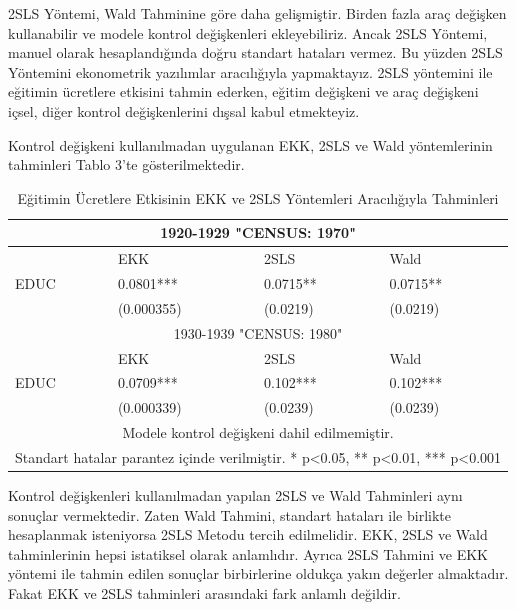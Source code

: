 \documentclass[12pt, a4paper, showtrims]{article}
\begin{document}
\begin{justify}
\begin{justify}
\begin{justify}
    2SLS Yöntemi, Wald Tahminine göre daha gelişmiştir. Birden fazla araç değişken kullanabilir ve 
    modele kontrol değişkenleri ekleyebiliriz. Ancak 2SLS Yöntemi, manuel olarak hesaplandığında doğru standart
    hataları vermez. Bu yüzden 2SLS Yöntemini ekonometrik yazılımlar aracılığıyla yapmaktayız.
    2SLS yöntemini ile eğitimin ücretlere etkisini tahmin ederken, eğitim değişkeni ve araç değişkeni içsel,
    diğer kontrol değişkenlerini dışsal kabul etmekteyiz.
    
    Kontrol değişkeni kullanılmadan uygulanan EKK, 2SLS ve Wald yöntemlerinin tahminleri Tablo 3'te 
    gösterilmektedir.



    \begin{table}[h]
        \centering
        \caption{Eğitimin Ücretlere Etkisinin EKK ve 2SLS Yöntemleri Aracılığıyla Tahminleri}
        \begin{tabular}{|p{4cm}||p{2cm}|p{2cm}|p{2cm}|}   
        \hline
        \multicolumn{4}{|c|}{1920-1929 "CENSUS: 1970"} \\
         \hline
          & EKK & 2SLS & Wald \\ [0.5ex] 
         \hline
          EDUC &  0.0801***  &  0.0715**  & 0.0715** \\ & (0.000355) & (0.0219) & (0.0219)  \\ 
        \hline
        \multicolumn{4}{|c|}{1930-1939 "CENSUS: 1980"} \\
         \hline
          & EKK & 2SLS & Wald \\ [0.5ex] 
         \hline
          EDUC & 0.0709*** & 0.102***  & 0.102*** \\ & (0.000339) & (0.0239) & (0.0239)  \\ 
        \hline
        \multicolumn{4}{|c|}{Modele kontrol değişkeni dahil edilmemiştir.} \\
        \hline
        \multicolumn{4}{|c|}{Standart hatalar parantez içinde verilmiştir. * p<0.05, ** p<0.01, *** p<0.001} \\
        \hline
        
        
        \end{tabular}
    \end{table}
    
    Kontrol değişkenleri kullanılmadan yapılan 2SLS ve Wald Tahminleri aynı sonuçlar vermektedir.
    Zaten Wald Tahmini, standart hataları ile birlikte hesaplanmak isteniyorsa 2SLS Metodu tercih edilmelidir.
    EKK, 2SLS ve Wald tahminlerinin hepsi istatiksel olarak anlamlıdır. Ayrıca 2SLS Tahmini ve 
    EKK yöntemi ile tahmin edilen sonuçlar birbirlerine oldukça yakın değerler almaktadır. Fakat 
    EKK ve 2SLS tahminleri arasındaki fark anlamlı değildir.


\end{justify}
\end{justify}
\end{justify}
\end{document}
